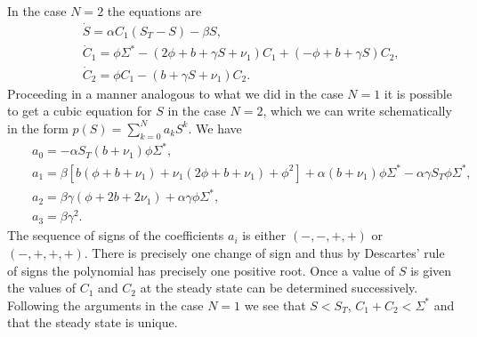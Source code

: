\documentclass{article}
\begin{document}
In the case $N=2$ the equations are
\begin{eqnarray}
&&\dot S=\alpha C_1(S_T-S)-\beta S,\\
&&\dot C_1=\phi\Sigma^*-(2\phi+b+\gamma S+\nu_1)C_1+(-\phi+b+\gamma S)C_2,\\
&&\dot C_2=\phi C_1-(b+\gamma S+\nu_1)C_2.
\end{eqnarray}
Proceeding in a manner analogous to what we did in the case $N=1$ it is possible
to get a cubic equation for $S$ in the case $N=2$, which we can write 
schematically in the form $p(S)=\sum_{k=0}^Na_kS^k$. We have
\begin{eqnarray}
&&a_0=-\alpha S_T(b+\nu_1)\phi\Sigma^*,\nonumber\\
&&a_1=\beta [b(\phi+b+\nu_1)+\nu_1(2\phi+b+\nu_1)+\phi^2]
+\alpha(b+\nu_1)\phi\Sigma^*-\alpha\gamma S_T\phi\Sigma^*,\nonumber\\
&&a_2=\beta\gamma (\phi+2b+2\nu_1)+\alpha\gamma\phi\Sigma^*,\nonumber\\
&&a_3=\beta\gamma^2.\nonumber
\end{eqnarray}
The sequence of signs of the coefficients $a_i$ is either $(-,-,+,+)$ or
$(-,+,+,+)$. There is precisely one change of sign and thus by Descartes' 
rule of signs the polynomial has precisely one positive root. Once a value
of $S$ is given the values of $C_1$ and $C_2$ at the steady state can be 
determined successively. Following the arguments in the case $N=1$ we see 
that $S<S_T$, $C_1+C_2<\Sigma^*$ and that the steady state is unique.
\end{document}
